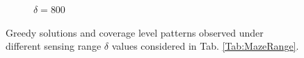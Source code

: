 \documentclass[letterpaper, 10 pt, conference]{ieeeconf}
\begin{document}
\begin{figure}[!t]
\begin{subfigure}[t]{0.30\columnwidth}
    \caption{$\delta = 800$}
\end{subfigure}%
\vspace{-3mm}
\caption{Greedy solutions and coverage level patterns observed under different sensing range $\delta$ values considered in Tab. \ref{Tab:MazeRange}.}
\label{Fig:MazeRange}
\end{figure}


\end{document}
